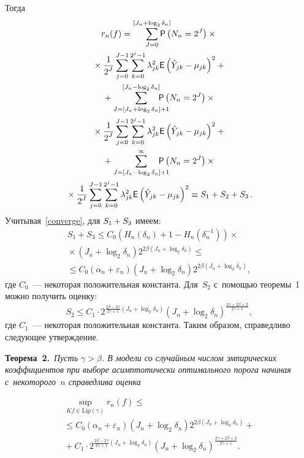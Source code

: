 \begin{multicols}{2}
Тогда
\begin{multline*}
r_n(f)=\sum\limits_{J=0}^{[J_n+\log_2\delta_n]}\hspace*{-5mm}
{\sf P}\left(N_n=2^J\right)\times{}\\
{}\times\fr{1}{2^J}
\sum\limits_{j=0}^{J-1}\sumk\limits \lambda^2_{jk}
{\sf E}\left(\hat{Y}_{jk}-\mujk\right)^2+{}\\
{}+\sum\limits_{J=[J_n+\log_2\delta_n]+1}^{[J_n-\log_2\delta_n]}
\hspace*{-5mm}
{\sf P}\left(N_n=2^J\right)\times{}\\
{}\times \fr{1}{2^J}
\sum\limits_{j=0}^{J-1}\sumk\limits \lambda^2_{jk}
{\sf E}\left(\hat{Y}_{jk}-\mujk\right)^2+{}\\
{}+\sum\limits_{J=[J_n-\log_2\delta_n]+1}^{\infty}
\hspace*{-5mm}
{\sf P}
\left(N_n=2^J\right)\times{}\\
{}\times\fr{1}{2^J}\sum\limits_{j=0}^{J-1}\sumk\limits \lambda^2_{jk}
{\sf E}\left(\hat{Y}_{jk}-\mujk\right)^2\equiv S_1+S_2+S_3\,.
\end{multline*}
Учитывая~\eqref{converge}, для $S_1\hm+S_3$ имеем:
\begin{multline*}
S_1+S_3\leqslant C_0\left(H_n\left(\delta_n\right)+1-H_n
\left(\delta^{-1}_n\right)\right)\times{}\\
{}\times
\left(J_n+\log_2\delta_n\right)2^{2\beta(J_n+\log_2\delta_n)}
\leqslant{}\\ 
{}\leqslant C_0\left(\alpha_n+\varepsilon_n\right)
\left(J_n+\log_2\delta_n\right)2^{2\beta(J_n+\log_2\delta_n)},
\end{multline*}
где $C_0$~--- некоторая положительная константа.
Для~$S_2$ с~помощью теоремы~1 можно получить \mbox{оценку}:
\begin{equation*}
S_2\leqslant C_1 \cdot
2^{\frac{2\beta-2\gamma}{2\gamma+1}(J_n+\log_2\delta_n)}
\left(J_n+\log_2\delta_n\right)^{\frac{2\gamma+2\beta+2}{2\gamma+1}},
\end{equation*}
где $C_1$~--- некоторая положительная константа. 
Таким образом, справедливо следующее утверждение.

\smallskip


\noindent
\textbf{Теорема~2.}\
\textit{Пусть $\gamma>\beta$. В модели со случайным чис\-лом эмпирических коэффициентов при выборе асимптотически
 оптимального порога начиная с~некоторого~$n$ справедлива оценка}
 
\noindent
\begin{multline*}
\sup\limits_{Kf\in \mathrm{Lip}(\gamma)}
{r_n(f)}\leqslant{}\\
{}\leqslant  C_0\left(\alpha_n+\varepsilon_n\right)
\left(J_n+\log_2\delta_n\right)
2^{2\beta(J_n+\log_2\delta_n)}+{}\\
{}+
C_1\cdot 2^{\frac{2\beta-2\gamma}{2\gamma+1}(J_n+\log_2\delta_n)}
\left(J_n+\log_2\delta_n\right)^{\frac{2\gamma+2\beta+2}{2\gamma+1}}.
\end{multline*}


\end{multicols}
